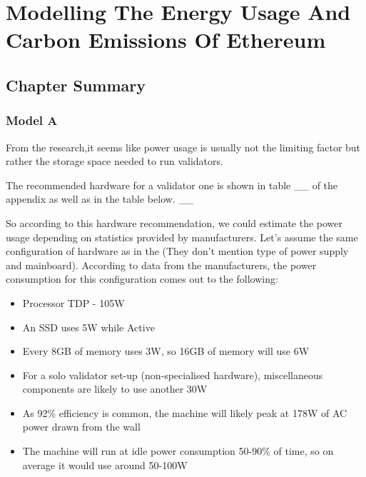 \chapter{Modelling The Energy Usage And Carbon Emissions Of Ethereum}
\label{Modelling}

\section{Chapter Summary}



\subsection{Model A}
From the research,it seems like power usage is usually not the limiting factor but rather the storage space needed to run validators.

The recommended hardware for a validator one is shown in table \_\_ of the appendix as well as in the table below. \_\_

So according to this hardware recommendation, we could estimate the power usage depending on statistics provided by manufacturers. Let's assume the same configuration of hardware as in the \cite{CryptoCarbonRatingsInstitute2022TheNetwork} (They don't mention type of power supply and mainboard).  According to data from the manufacturers, the power consumption for this configuration comes out to the following: 

\begin{itemize}
    \item Processor TDP - 105W
    
    \item An SSD uses 5W while Active
    
    \item Every 8GB of memory uses 3W, so 16GB of memory will use 6W
    
    \item For a solo validator set-up (non-specialised hardware), miscellaneous components are likely to use another 30W
    
    \item As 92\% efficiency is common, the machine will likely peak at 178W of AC power drawn from the wall
    
    \item The machine will run at idle power consumption 50-90\% of time, so on average it would use around 50-100W
    
\end{itemize}

